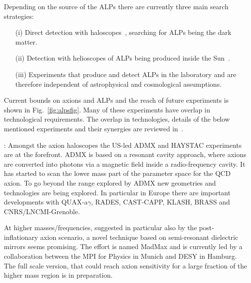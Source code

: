 \documentclass[../report.tex]{subfiles}
\begin{document}

Depending on the source of the ALPs there are currently three main search strategies:
\begin{enumerate}
\item[(i)] Direct detection with haloscopes~\cite{Sikivie:1983ip}, searching for ALPs being the dark matter.
\item[(ii)] Detection with helioscopes of ALPs being produced inside the Sun~\cite{Sikivie:1983ip}.
\item[(iii)] Experiments that produce and detect ALPs in the laboratory and are therefore independent of astrophysical and cosmological assumptions.
\end{enumerate}
Current bounds on axions and ALPs and the reach of future experiments is shown
in Fig.~\ref{fig:alpsfig}.
Many of these experiments have overlap in technological requirements. The overlap in technologies, details of the below mentioned experiments and their synergies
are reviewed in~\cite{Siemko:2652165}.

: Amongst the axion haloscopes the US-led ADMX
and HAYSTAC
experiments are at the forefront.
ADMX is based on a resonant cavity approach, where axions are converted into photons via a magnetic field inside a
{radio-frequency} cavity. It {has started to} scan the lower mass part of the parameter space for the QCD axion. To go beyond the range explored by ADMX new geometries and technologies are being explored. In particular in Europe there are important developments with QUAX-a$\gamma$, %
RADES, CAST-CAPP,
KLASH, %
BRASS and CNRS/LNCMI-Grenoble.

At higher masses/frequencies, suggested in particular also by the post-inflationary axion scenario, a novel technique based on semi-resonant dielectric mirrors seems promising. The effort is named MadMax \cite{Majorovits:2017ppy} and is currently led by a collaboration between the MPI for Physics in Munich and DESY in Hamburg. 
The full scale version, that could reach axion sensitivity for a large fraction of the higher mass region is in preparation. 

\end{document}
